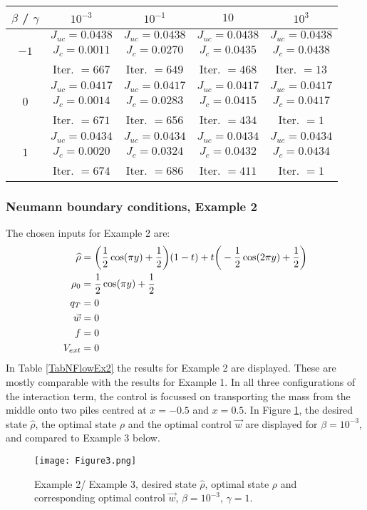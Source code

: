 \begin{table}[h]
	\begin{tabular}{ ||c|| c | c |c | c ||}
		\hline
		$\beta$ / $\gamma$ & $10^{-3}$  & $10^{-1}$  & $10$ & $10^3$ \\ 
		\hline 
		      & $J_{uc} = 0.0438$ & $J_{uc} = 0.0438$  & $J_{uc} = 0.0438$ & $J_{uc} = 0.0438$\\ 
		 $-1$ & $J_c = 0.0011$ & $J_c = 0.0270$ & $J_c = 0.0435$ & $J_c = 0.0438$\\ 
		      & Iter. $= 667$ & Iter. $= 649$  & Iter. $= 468$ & Iter. $= 13$\\ 
		 \hline
		      & $J_{uc} = 0.0417$ & $J_{uc} = 0.0417$   & $J_{uc} = 0.0417$& $J_{uc} = 0.0417$\\
		 $0$  & $J_c = 0.0014$ & $J_c = 0.0283$  & $J_c = 0.0415$ & $J_c = 0.0417$\\ 
		      & Iter. $= 671$ & Iter. $= 656$  & Iter. $= 434$ & Iter. $= 1$\\ 
		 \hline
		      & $J_{uc} = 0.0434$ & $J_{uc} = 0.0434$  & $J_{uc} = 0.0434$ & $J_{uc} = 0.0434$\\
		 $1$  & $J_c = 0.0020$ & $J_c = 0.0324$  & $J_c = 0.0432$ & $J_c = 0.0434$\\ 
		      & Iter. $= 674$ & Iter. $= 686$  & Iter. $= 411$ & Iter. $= 1$\\ 
		 \hline 
	\end{tabular}
    \caption{}
    \label{TabNFlowEx1}
\end{table}

\subsubsection{Neumann boundary conditions, Example 2} 
The chosen inputs for Example 2 are:
\begin{align*}
\widehat \rho &= \bigg(\frac{1}{2}\cos(\pi y) + \frac{1}{2}\bigg)(1-t) + t\bigg(-\frac{1}{2}\cos(2 \pi y) + \frac{1}{2}\bigg)\\
\rho_{0} &= \frac{1}{2}\cos(\pi y) + \frac{1}{2}\\
q_{T} &= 0\\
\vec{w} &= 0\\
f &=0\\
V_{ext} &=0
\end{align*}
In Table \ref{TabNFlowEx2} the results for Example 2 are displayed. These are mostly comparable with the results for Example 1. In all three configurations of the interaction term, the control is focussed on transporting the mass from the middle onto two piles centred at $x=-0.5$ and $x=0.5$. In Figure \ref{Ex22DN1}, the desired state $\widehat \rho$, the optimal state $\rho$ and the optimal control $\vec{w}$ are displayed for $\beta = 10^{-3}$, and compared to Example 3 below. 
\begin{figure}[h]
	\texttt{[image: Figure3.png]}
	\caption{Example 2/ Example 3, desired state $\widehat \rho$, optimal state $\rho$ and corresponding optimal control $\vec{w}$, $\beta = 10^{-3}$, $\gamma = 1$.}
	\label{Ex22DN1}
\end{figure}

